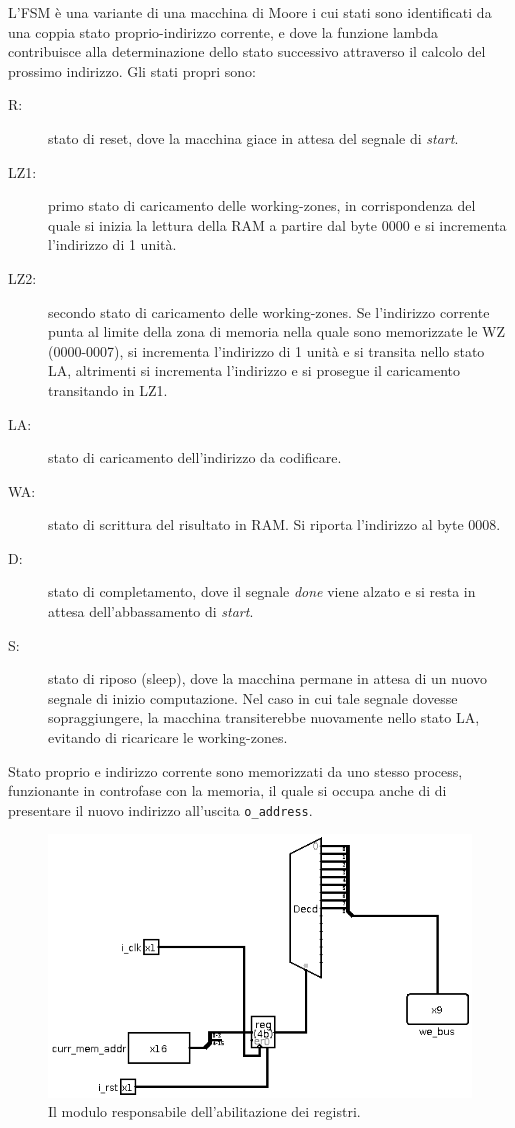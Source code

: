 \documentclass[11pt,a4paper]{article}
\begin{document}
L'FSM è una variante di una macchina di Moore i cui stati sono identificati da una coppia stato proprio-indirizzo corrente, e dove la funzione lambda
contribuisce alla determinazione dello stato successivo attraverso il calcolo del prossimo indirizzo. Gli stati propri sono:
\begin{description}
    \item[R:] stato di reset, dove la macchina giace in attesa del segnale di \emph{start}.
    \item[LZ1:] primo stato di caricamento delle working-zones, in corrispondenza del quale si inizia la lettura della RAM a partire dal byte 0000 e si
        incrementa l'indirizzo di 1 unità.
    \item[LZ2:] secondo stato di caricamento delle working-zones. Se l'indirizzo corrente punta al limite della zona di memoria nella quale sono
        memorizzate le WZ (0000-0007), si incrementa l'indirizzo di 1 unità e si transita nello stato LA, altrimenti si incrementa l'indirizzo e si
        prosegue il caricamento transitando in LZ1.
    \item[LA:] stato di caricamento dell'indirizzo da codificare.
    \item[WA:] stato di scrittura del risultato in RAM. Si riporta l'indirizzo al byte 0008.
    \item[D:] stato di completamento, dove il segnale \emph{done} viene alzato e si resta in attesa dell'abbassamento di \emph{start}.
    \item[S:] stato di riposo (sleep), dove la macchina permane in attesa di un nuovo segnale di inizio computazione. Nel caso in cui tale segnale dovesse
        sopraggiungere, la macchina transiterebbe nuovamente nello stato LA, evitando di ricaricare le working-zones.
\end {description}
Stato proprio e indirizzo corrente sono memorizzati da uno stesso process, funzionante in controfase con la memoria, il quale si occupa anche di di
presentare il nuovo indirizzo all'uscita \lstinline{o_address}.

\begin{figure}[ht]
    \includegraphics[scale=0.5]{reg_enabler.png}
    \caption[Gestore registri]{Il modulo responsabile dell'abilitazione dei registri.\label{reg_enabler}}
\end{figure}
\end{document}
